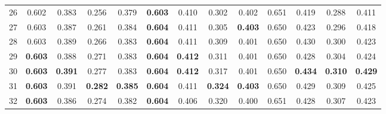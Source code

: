 \documentclass[11pt,a4paper]{article}
\begin{document}
\begin{landscape}
\begin{table}[p]
\begin{tabular}{rcccccccccccc}
26 & 0.602 & 0.383 & 0.256 & 0.379 & \textbf{0.603} & 0.410 & 0.302 & 0.402 & 0.651 & 0.419 & 0.288 & 0.411 \\
27 & 0.603 & 0.387 & 0.261 & 0.384 & \textbf{0.604} & 0.411 & 0.305 & \textbf{0.403} & 0.650 & 0.423 & 0.296 & 0.418 \\
28 & 0.603 & 0.389 & 0.266 & 0.383 & \textbf{0.604} & 0.411 & 0.309 & 0.401 & 0.650 & 0.430 & 0.300 & 0.423 \\
29 & \textbf{0.603} & 0.388 & 0.271 & 0.383 & \textbf{0.604} & \textbf{0.412} & 0.311 & 0.401 & 0.650 & 0.428 & 0.304 & 0.424 \\
30 & \textbf{0.603} & \textbf{0.391} & 0.277 & 0.383 & \textbf{0.604} & \textbf{0.412} & 0.317 & 0.401 & 0.650 & \textbf{0.434} & \textbf{0.310} & \textbf{0.429} \\
31 & \textbf{0.603} & 0.391 & \textbf{0.282} & \textbf{0.385} & \textbf{0.604} & 0.411 & \textbf{0.324} & \textbf{0.403} & 0.650 & 0.429 & 0.309 & 0.425 \\
32 & \textbf{0.603} & 0.386 & 0.274 & 0.382 & \textbf{0.604} & 0.406 & 0.320 & 0.400 & 0.651 & 0.428 & 0.307 & 0.423 \\
\bottomrule
\end{tabular}\end{table}\end{landscape}
\end{document}
